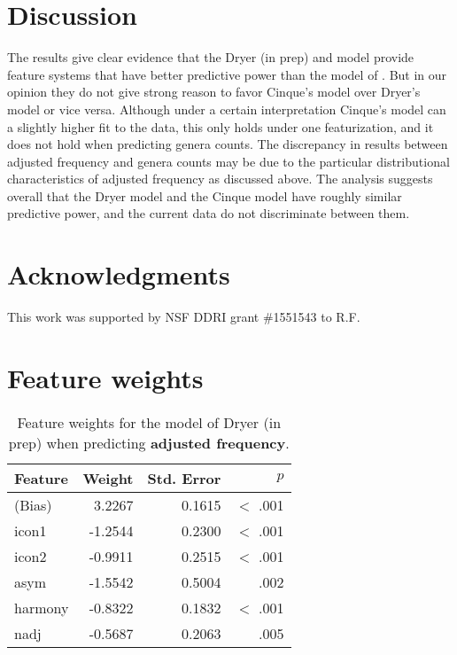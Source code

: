 \documentclass[11pt]{article}
\newcommand{\lt}{<}
\begin{document}
\section{Discussion}

The results give clear evidence that the Dryer (in prep) and \citet{cinque2005deriving} model provide feature systems that have better predictive power than the model of \citet{cysouw2010dealing}. But in our opinion they do not give strong reason to favor Cinque's model over Dryer's model or vice versa. Although under a certain interpretation Cinque's model can a slightly higher fit to the data, this only holds under one featurization, and it does not hold when predicting genera counts. The discrepancy in results between adjusted frequency and genera counts may be due to the particular distributional characteristics of adjusted frequency as discussed above. The analysis suggests overall that the Dryer model and the Cinque model have roughly similar predictive power, and the current data do not discriminate between them.


\section*{Acknowledgments} 

This work was supported by NSF DDRI grant \#1551543 to R.F.

\nocite{dryer2017order}




\appendix
\section{Feature weights}
\begin{table}[ht!]
  \centering
  \begin{tabular}{|l|r|r|r|}
    \hline
    Feature & Weight & Std. Error & $p$ \\
    \hline
    (Bias) &  3.2267  &   0.1615 &  $\lt$ .001 \\
    icon1  & -1.2544  &   0.2300 &  $\lt$ .001 \\
    icon2  & -0.9911 &      0.2515 &  $\lt$ .001 \\
    asym  &  -1.5542 &      0.5004 &  .002 \\
    harmony &     -0.8322   &  0.1832 & $\lt$ .001 \\
    nadj    &     -0.5687  &   0.2063 & .005    \\
    \hline
  \end{tabular}
  \caption{Feature weights for the model of Dryer (in prep) when predicting \textbf{adjusted frequency}.}
\end{table}
\end{document}
